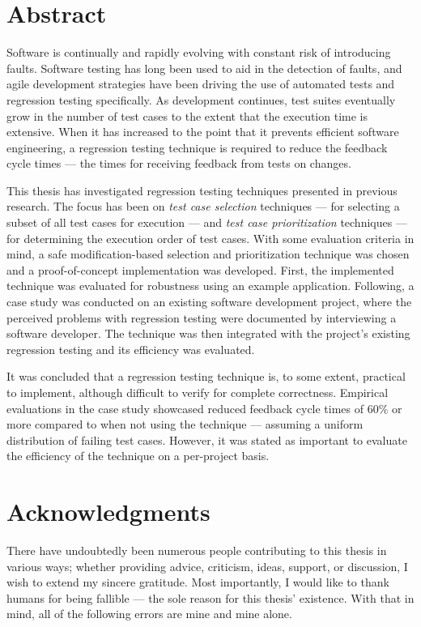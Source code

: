 \documentclass[a4paper,english,12pt]{report}
\let\Chapter\chapter
\def\chapter{\addtocontents{lol}{\protect\addvspace{10pt}}\Chapter}
\begin{document}
\pagestyle{empty}





\chapter*{Abstract}
\thispagestyle{empty}
Software is continually and rapidly evolving with constant risk of introducing faults. Software testing has long been used to aid in the detection of faults, and agile development strategies have been driving the use of automated tests and regression testing specifically. As development continues, test suites eventually grow in the number of test cases to the extent that the execution time is extensive. When it has increased to the point that it prevents efficient software engineering, a regression testing technique is required to reduce the feedback cycle times --- the times for receiving feedback from tests on changes.

This thesis has investigated regression testing techniques presented in previous research. The focus has been on \textit{test case selection} techniques --- for selecting a subset of all test cases for execution --- and \textit{test case prioritization} techniques --- for determining the execution order of test cases. With some evaluation criteria in mind, a safe modification-based selection and prioritization technique was chosen and a proof-of-concept implementation was developed. First, the implemented technique was evaluated for robustness using an example application. Following, a case study was conducted on an existing software development project, where the perceived problems with regression testing were documented by interviewing a software developer. The technique was then integrated with the project's existing regression testing and its efficiency was evaluated.

It was concluded that a regression testing technique is, to some extent, practical to implement, although difficult to verify for complete correctness. Empirical evaluations in the case study showcased reduced feedback cycle times of 60\% or more compared to when not using the technique --- assuming a uniform distribution of failing test cases. However, it was stated as important to evaluate the efficiency of the technique on a per-project basis.

\chapter*{Acknowledgments}
\thispagestyle{empty}
There have undoubtedly been numerous people contributing to this thesis in various ways; whether providing advice, criticism, ideas, support, or discussion, I wish to extend my sincere gratitude. Most importantly, I would like to thank humans for being fallible --- the sole reason for this thesis' existence. With that in mind, all of the following errors are mine and mine alone.
\end{document}
